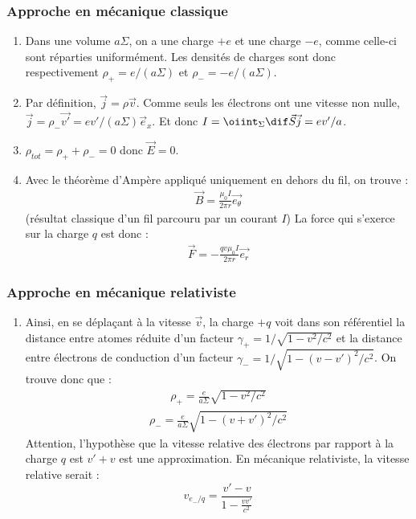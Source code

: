\begin{correction}

\subsubsection*{Approche en mécanique classique}

\begin{enumerate}
	\item Dans une volume $a\Sigma$, on a une charge $+e$ et une charge $-e$, comme celle-ci sont réparties uniformément. Les densités de charges sont donc respectivement $\rho_+=e/(a\Sigma)$ et $\rho_-=-e/(a\Sigma)$.
	\item Par définition, $\vec{j}=\rho\vec{v}$. Comme seuls les électrons ont une vitesse non nulle, $\vec{j}=\rho_-\vec{v'}=ev'/(a\Sigma)\vec{e}_x$. Et donc $I=\oiint_\Sigma\dif\vec{S}\vec{j}=ev'/a$.
	\item $\rho_{tot}=\rho_++\rho_-=0$ donc $\vec{E}=0$.
	\item Avec le théorème d'Ampère appliqué uniquement en dehors du fil, on trouve :
	\begin{align*}
		\vec{B}=\frac{\mu_0I}{2\pi r}\vec{e_\theta}
	\end{align*}
	(résultat classique d'un fil parcouru par un courant $I$)
	La force qui s'exerce sur la charge $q$ est donc :
	\begin{align*}
		\vec{F}=-\frac{qv\mu_0I}{2\pi r}\vec{e_r}
	\end{align*}
\end{enumerate}

\subsubsection*{Approche en mécanique relativiste}

	\begin{enumerate}
	
	\item Ainsi, en se déplaçant à la vitesse $\vec{v}$, la charge $+q$ voit dans son référentiel la distance entre atomes réduite d'un facteur $\gamma_{+}=1/\sqrt{1-v^{2}/c^{2}}$ et la distance entre électrons de conduction d'un facteur $\gamma_{-}=1/\sqrt{1-(v-v')^{2}/c^{2}}$. 
		On trouve donc que :
		\begin{align*}
			\rho_+=\frac{e}{a\Sigma}\sqrt{1-v^{2}/c^{2}}
		\end{align*}
		\begin{align*}
			\rho_-=\frac{e}{a\Sigma}\sqrt{1-(v+v')^{2}/c^{2}}
		\end{align*}		
		Attention, l'hypothèse que la vitesse relative des électrons par rapport à la charge $q$ est $v'+v$ est une approximation. En mécanique relativiste, la vitesse relative serait :
		\begin{equation}
			v_{e_-/q}=\frac{v'-v}{1-\frac{vv'}{c^2}}
		\end{equation}
		

\end{enumerate}
\end{correction}
